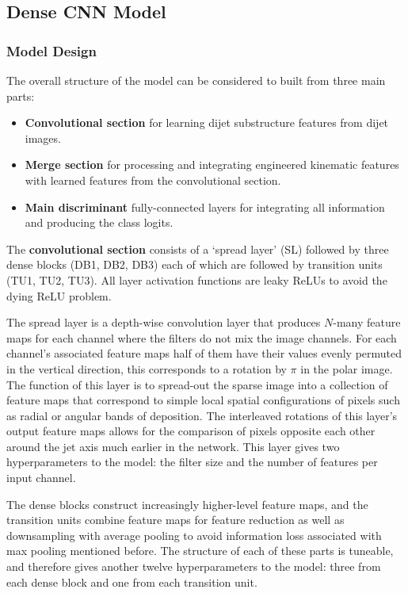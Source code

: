 \subsection{Dense CNN Model}

\subsubsection{Model Design}
The overall structure of the model can be considered to built from three main parts:
\begin{itemize}[noitemsep]
    \item \textbf{Convolutional section} for learning dijet substructure features from dijet images.
    \item \textbf{Merge section} for processing and integrating engineered kinematic features with learned features from the convolutional section.
    \item \textbf{Main discriminant} fully-connected layers for integrating all information and producing the class logits.
\end{itemize}

The \textbf{convolutional section} consists of a `spread layer' (SL) followed by three dense blocks (DB1, DB2, DB3) each of which are followed by transition units (TU1, TU2, TU3). All layer activation functions are leaky ReLUs to avoid the dying ReLU problem.

The spread layer is a depth-wise convolution layer that produces $N$-many feature maps for each channel where the filters do not mix the image channels. 
For each channel's associated feature maps half of them have their values evenly permuted in the vertical direction, this corresponds to a rotation by $\pi$ in the polar image.
The function of this layer is to spread-out the sparse image into a collection of feature maps that correspond to simple local spatial configurations of pixels such as radial or angular bands of deposition. 
The interleaved rotations of this layer's output feature maps allows for the comparison of pixels opposite each other around the jet axis much earlier in the network.  
This layer gives two hyperparameters to the model: the filter size and the number of features per input channel.

The dense blocks construct increasingly higher-level feature maps, and the transition units combine feature maps for feature reduction as well as downsampling with average pooling to avoid information loss associated with max pooling mentioned before.  
The structure of each of these parts is tuneable, and therefore gives another twelve hyperparameters to the model: three from each dense block and one from each transition unit. 

